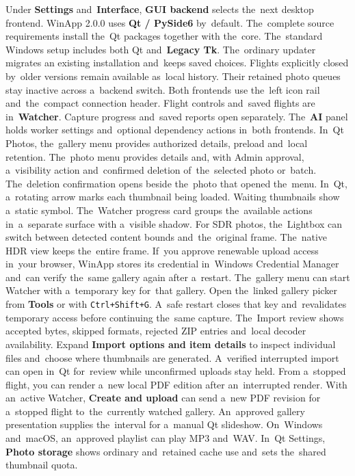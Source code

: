 \documentclass[11pt,a4paper]{article}
\newcommand{\ui}[1]{\textbf{#1}}
\newcommand{\codeword}[1]{\nolinkurl{#1}}
\begin{document}
Under \ui{Settings} and~\ui{Interface}, \ui{GUI backend} selects the~next
desktop frontend. WinApp 2.0.0 uses \ui{Qt / PySide6} by~default.
The~complete source requirements install the~Qt packages together with the~core.
The~standard Windows setup includes both Qt and~\ui{Legacy Tk}.
The~ordinary updater migrates an existing installation and~keeps saved choices.
Flights explicitly closed by~older versions remain available as~local history.
Their retained photo queues stay inactive across a~backend switch.
Both frontends use the~left icon rail and~the~compact connection header.
Flight controls and~saved flights are in~\ui{Watcher}.
Capture progress and~saved reports open separately. The~\ui{AI} panel
holds worker settings and~optional dependency actions in~both frontends.
In~Qt Photos, the~gallery menu provides authorized details, preload and~local
retention. The~photo menu provides details and, with Admin approval, a~visibility
action and~confirmed deletion of~the~selected photo or~batch.
The~deletion confirmation opens beside the~photo that opened the~menu.
In~Qt, a~rotating arrow marks each thumbnail being loaded. Waiting thumbnails
show a~static symbol. The~Watcher progress card groups the~available actions
in~a~separate surface with a~visible shadow.
For SDR photos, the~Lightbox can switch between detected content bounds
and~the~original frame. The~native HDR view keeps the~entire frame.
If~you approve renewable upload access in~your browser, WinApp stores its
credential in~Windows Credential Manager and~can verify the~same gallery
again after a~restart.
The~gallery menu can start Watcher with a~temporary key for~that gallery.
Open the~linked gallery picker from \ui{Tools} or with \codeword{Ctrl+Shift+G}.
A~safe restart closes that key and~revalidates temporary access before
continuing the~same capture.
The~Import review shows accepted bytes, skipped formats, rejected ZIP entries
and~local decoder availability. Expand \ui{Import options and item details}
to inspect individual files and~choose where thumbnails are generated.
A~verified interrupted import can open in~Qt for~review while unconfirmed
uploads stay held. From a~stopped flight, you can render a~new local PDF
edition after an~interrupted render.
With an~active Watcher, \ui{Create and upload} can send a~new PDF revision
for a~stopped flight to~the~currently watched gallery.
An~approved gallery presentation supplies the~interval for a~manual Qt
slideshow. On~Windows and~macOS, an~approved playlist can play MP3 and~WAV.
In~Qt Settings, \ui{Photo storage} shows ordinary and~retained cache use
and~sets the~shared thumbnail quota.
\end{document}
